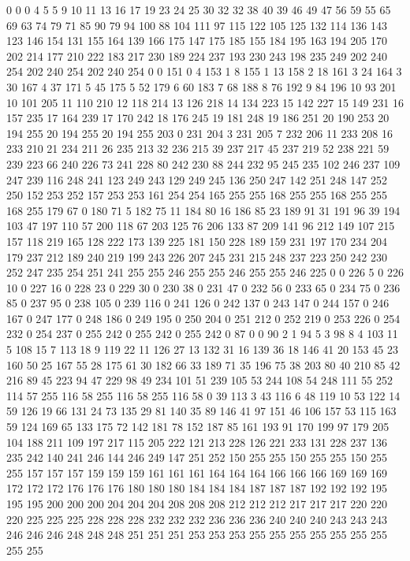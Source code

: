 0 0 0 4 5 5 9 10 11 13 16 17 19 23 24 25 30 32 32 38 40 39 46 49 47 56 59 55 65 69 63 74 79 71 85 90 79 94 100 88 104 111 97 115 122 105 125 132 114 136 143 123 146 154 131 155 164 139 166 175 147 175 185 155 184 195 163 194 205 170 202 214 177 210 222 183 217 230 189 224 237 193 230 243 198 235 249 202 240 254 202 240 254 202 240 254 0 0 151 0 4 153 1 8 155 1 13 158 2 18 161 3 24 164 3 30 167 4 37 171 5 45 175 5 52 179 6 60 183 7 68 188 8 76 192 9 84 196 10 93 201 10 101 205 11 110 210 12 118 214 13 126 218 14 134 223 15 142 227 15 149 231 16 157 235 17 164 239 17 170 242 18 176 245 19 181 248 19 186 251 20 190 253 20 194 255 20 194 255 20 194 255 203 0 231 204 3 231 205 7 232 206 11 233 208 16 233 210 21 234 211 26 235 213 32 236 215 39 237 217 45 237 219 52 238 221 59 239 223 66 240 226 73 241 228 80 242 230 88 244 232 95 245 235 102 246 237 109 247 239 116 248 241 123 249 243 
129 249 245 136 250 247 142 251 248 147 252 250 152 253 252 157 253 253 161 254 254 165 255 255 168 255 255 168 255 255 168 255 179 67 0 180 71 5 182 75 11 184 80 16 186 85 23 189 91 31 191 96 39 194 103 47 197 110 57 200 118 67 203 125 76 206 133 87 209 141 96 212 149 107 215 157 118 219 165 128 222 173 139 225 181 150 228 189 159 231 197 170 234 204 179 237 212 189 240 219 199 243 226 207 245 231 215 248 237 223 250 242 230 252 247 235 254 251 241 255 255 246 255 255 246 255 255 246 225 0 0 226 5 0 226 10 0 227 16 0 228 23 0 229 30 0 230 38 0 231 47 0 232 56 0 233 65 0 234 75 0 236 85 0 237 95 0 238 105 0 239 116 0 241 126 0 242 137 0 243 147 0 244 157 0 246 167 0 247 177 0 248 186 0 249 195 0 250 204 0 251 212 0 252 219 0 253 226 0 254 232 0 254 237 0 255 242 0 255 242 0 255 242 0 87 0 0 90 2 1 94 5 3 98 8 4 103 11 5 108 15 7 113 18 9 119 22 11 126 27 13 132 31 16 139 36 
18 146 41 20 153 45 23 160 50 25 167 55 28 175 61 30 182 66 33 189 71 35 196 75 38 203 80 40 210 85 42 216 89 45 223 94 47 229 98 49 234 101 51 239 105 53 244 108 54 248 111 55 252 114 57 255 116 58 255 116 58 255 116 58 0 39 113 3 43 116 6 48 119 10 53 122 14 59 126 19 66 131 24 73 135 29 81 140 35 89 146 41 97 151 46 106 157 53 115 163 59 124 169 65 133 175 72 142 181 78 152 187 85 161 193 91 170 199 97 179 205 104 188 211 109 197 217 115 205 222 121 213 228 126 221 233 131 228 237 136 235 242 140 241 246 144 246 249 147 251 252 150 255 255 150 255 255 150 255 255 157 157 157 159 159 159 161 161 161 164 164 164 166 166 166 169 169 169 172 172 172 176 176 176 180 180 180 184 184 184 187 187 187 192 192 192 195 195 195 200 200 200 204 204 204 208 208 208 212 212 212 217 217 217 220 220 220 225 225 225 228 228 228 232 232 232 236 236 236 240 240 240 243 243 243 246 246 246 248 248 248 251 251 251 253 253 253 255 255 255 255 255 255 255 255 255 
